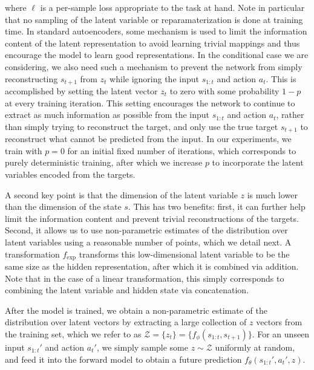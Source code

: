 \documentclass{article} %
\begin{document}
where $\ell$ is a per-sample loss appropriate to the task at hand. Note in particular that no sampling of the latent variable or reparamaterization is done at training time.
In standard autoencoders, some mechanism is used to limit the information content of the latent representation to avoid learning trivial mappings and thus encourage the model to learn good representations.
In the conditional case we are considering, we also need such a mechanism to prevent the network from simply reconstructing $s_{t+1}$ from $z_t$ while ignoring the input $s_{1:t}$ and action $a_t$.
This is accomplished by setting the latent vector $z_t$ to zero with some probability $1 - p$ at every training iteration.
This setting encourages the network to continue to extract as much information as possible from the input $s_{1:t}$ and action $a_t$, rather than simply trying to reconstruct the target, and only use the true target $s_{t+1}$ to reconstruct what cannot be predicted from the input.
In our experiments, we train with $p = 0$ for an initial fixed number of iterations, which corresponds to purely deterministic training, after which we increase $p$ to incorporate the latent variables encoded from the targets.

A second key point is that the dimension of the latent variable $z$ is much lower than the dimension of the state $s$.
This has two benefits: first, it can further help limit the information content and prevent trivial reconstructions of the targets.
Second, it allows us to use non-parametric estimates of the distribution over latent variables using a reasonable number of points, which we detail next.
A transformation $f_\text{exp}$ transforms this low-dimensional latent variable to be the same size as the hidden representation, after which it is combined via addition.
Note that in the case of a linear transformation, this simply corresponds to combining the latent variable and hidden state via concatenation.


After the model is trained, we obtain a non-parametric estimate of the distribution over latent vectors by extracting a large collection of $z$ vectors from the training set, which we refer to as $\mathcal{Z} = \{ z_t \} = \{ f_\phi(s_{1:t}, s_{t+1}) \}$.
For an unseen input $s_{1:t}'$ and action $a_t'$, we simply sample some $z \sim \mathcal{Z}$ uniformly at random, and feed it into the forward model to obtain a future prediction $f_\theta(s_{1:t}', a_t', z)$.
\end{document}
